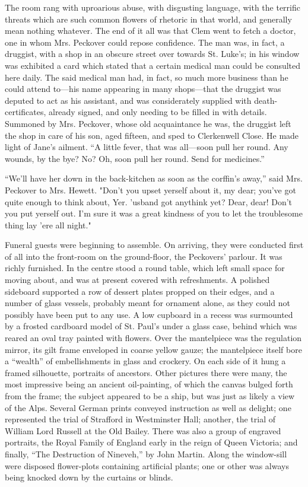 The room rang with uproarious abuse, with disgusting language, with the
terrific threats which are such common flowers of rhetoric in that
world, and generally mean nothing whatever. The end of it all was that
Clem went to fetch a doctor, one in whom Mrs. Peckover could repose
confidence. The man was, in fact, a druggist, with a shop in an obscure
street over towards St. Luke's; in {\protect\hypertarget{95}{}{}}his
window was exhibited a card which stated that a certain medical man
could be consulted here daily. The said medical man had, in fact, so
much more business than he could attend to---his name appearing in many
shops---that the druggist was deputed to act as his assistant, and was
considerately supplied with death- certificates, already signed, and
only needing to be filled in with details. Summoned by Mrs. Peckover,
whose old acquaintance he was, the druggist left the shop in care of his
son, aged fifteen, and sped to Clerkenwell Close. He made light of
Jane's ailment. ``A little fever, that was all---soon pull her round.
Any wounds, by the bye? No? Oh, soon pull her round. Send for
medicines.''

``We'll have her down in the back-kitchen as soon as the corffin's
away,'' said Mrs. Peckover to Mrs. Hewett. "Don't you upset yerself
about it, my dear; you've got quite enough to think about, Yer. 'usband
got anythink yet? Dear, dear! Don't you put yerself out. I'm sure it was
a great {\protect\hypertarget{96}{}{}}kindness of you to let the
troublesome thing lay 'ere all night."

Funeral guests were beginning to assemble. On arriving, they were
conducted first of all into the front-room on the ground-floor, the
Peckovers' parlour. It was richly furnished. In the centre stood a round
table, which left small space for moving about, and was at present
covered with refreshments. A polished sideboard supported a row of
dessert plates propped on their edges, and a number of glass vessels,
probably meant for ornament alone, as they could not possibly have been
put to any use. A low cupboard in a recess was surmounted by a frosted
cardboard model of St. Paul's under a glass case, behind which was
reared an oval tray painted with flowers. Over the mantelpiece was the
regulation mirror, its gilt frame enveloped in coarse yellow gauze; the
mantelpiece itself bore a ``wealth'' of embellishments in glass and
crockery. On each side of it hung a framed silhouette, portraits of
ancestors. Other pictures there were many, the most
{\protect\hypertarget{97}{}{}}impressive being an ancient oil-painting,
of which the canvas bulged forth from the frame; the subject appeared to
be a ship, but was just as likely a view of the Alps. Several German
prints conveyed instruction as well as delight; one represented the
trial of Strafford in Westminster Hall; another, the trial of William
Lord Russell at the Old Bailey. There was also a group of engraved
portraits, the Royal Family of England early in the reign of Queen
Victoria; and finally, ``The Destruction of Nineveh,'' by John Martin.
Along the window-sill were disposed flower-plots containing artificial
plants; one or other was always being knocked down by the curtains or
blinds.

